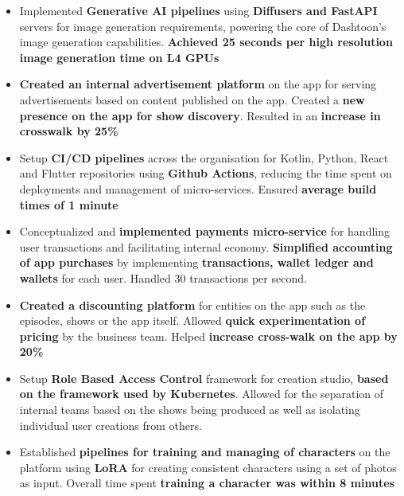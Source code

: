 \documentclass[12pt]{article}
\newcommand{\experienceItem}{\item [-] \small}
\begin{document}
{{{\begin{itemize}[itemsep=0.1ex, leftmargin=6ex, rightmargin=1ex]
{                        \textbf {7 Kubernetes clusters}, giving real time insights on latencies and errors.
                        \textbf {Reduced mean time to resolve issues by 50\%}
                    }
                    \experienceItem
                    {
                        Implemented \textbf {Generative AI pipelines} using \textbf {Diffusers and FastAPI} servers for
                        image \mbox {generation} requirements, powering the core of Dashtoon's image generation capabilities.
                        \textbf {Achieved 25 seconds per high resolution image generation time on L4 GPUs}
                    }
                    \experienceItem
                    {
                        \textbf {Created an internal advertisement platform} on the app for serving advertisements based on
                        content published on the app. Created a \textbf {new presence on the app for show discovery}.
                        Resulted in an \textbf {increase in crosswalk by 25\%}
                    }
                    \experienceItem
                    {
                        Setup \textbf {CI/CD pipelines} across the organisation for Kotlin, Python, React and Flutter
                        \mbox {repositories} using \textbf {Github Actions}, reducing the time spent on deployments and
                        management of micro-services. Ensured \textbf {average build times of 1 minute}
                    }
                    \experienceItem
                    {
                        Conceptualized and \textbf {implemented payments micro-service} for handling user transactions and
                        facilitating internal economy. \textbf {Simplified accounting of app purchases} by implementing
                        \textbf {transactions, wallet ledger and wallets} for each user. Handled 30 transactions per second.
                    }
                    \experienceItem
                    {
                        \textbf {Created a discounting platform} for entities on the app such as the episodes, shows
                        or the app itself. Allowed \textbf {quick experimentation of pricing} by the business team.
                        Helped \textbf {increase cross-walk on the app by 20\%}
                    }
                    \experienceItem
                    {
                        Setup \textbf {Role Based Access Control} framework for creation studio, \textbf {based on the
                        framework used by Kubernetes}. Allowed for the separation of internal teams based on the shows
                        being produced as well as isolating individual user creations from others.
                    }
                    \experienceItem
                    {
                        Established \textbf {pipelines for training and managing of characters} on the platform using
                        \textbf {LoRA} for creating consistent characters using a set of photos as input. Overall time
                        spent \textbf {training a character was within 8 minutes}
                    }
                \end{itemize}
            }
        }

}
\end{document}
